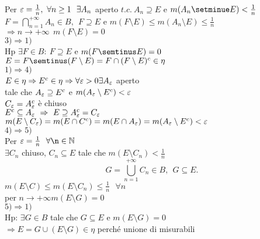\documentclass[12px]{article}
\begin{document}
\begin{dimo}
	  Per  $\e = \frac 1n, \ \forall n\geq 1 \ \ \exists A_n$ aperto $t.c. \ A_n\supseteq E$ e $m(A_n\setminue E)< \frac 1n$\\
	  $F = \bigcap^{+\infty}_{n=1}A_n\in B,\ \ F\supseteq E$ e $m(F\setminus E)\leq m(A_n\setminus E) \leq \frac 1n$\\
	  $ \Rightarrow  n \rightarrow +\infty \ \ m(F\setminus E) = 0$\\[10px]
	   $3) \Rightarrow 1)$ \\
	   Hp $\exists F\in B: \ F\supseteq E $ e $m(F\semtinus E) = 0$\\
	    $ E = F\semtinus(F\setminus E) = F\cap (F\setminus E)^c\in \eta$\\
	     $1) \Rightarrow 4)$ \\
	     $E\in \eta \Rightarrow E^c \in \eta \Rightarrow \forall \varepsilon > 0 \exists A_\varepsilon$ aperto\\
	     tale che $A_\varepsilon\supseteq E^c$ e $m(A_\varepsilon\setminus E^c)<\varepsilon$\\
	      $C_\varepsilon = A_\varepsilon^c$ è chiuso\\
	      $E^c\subseteq A_\varepsilon \ \Rightarrow \ E\supseteq A_\varepsilon^c = C_\varepsilon$ \\
	      $m(E\setminus C_\varepsilon) = m(E\cap C^c) = m(E\cap A_\varepsilon) = m(A_\varepsilon\setminus E^c)<\varepsilon$\\[10px]
	      $4) \Rightarrow  5)$ \\
	      Per $\e = \frac 1n \ \ \forall\n\in \N$\\
	       $\exists C_n$ chiuso, $C_n \subseteq E$ tale che  $m(E\setminus C_n)< \frac 1n$\\
	       \[
	         G = \bigcup^{+\infty}_{n = 1}C_n\in B,  \ \ G\subseteq E
	       .\]
	       $m(E\setminus C) \leq m(E\setminus C_n)\leq \frac 1n \ \ \ \forall n$\\
	       per $n \rightarrow +\infty m(E\setminus G) = 0$ \\[10px]
	       $5) \Rightarrow  1)$ \\
	       Hp: $\exists G \in B$ tale che $G\subseteq E$ e $m(E\setminus G) = 0$\\
	        $ \Rightarrow E = G\cup (E\setminus G)\in \eta$ perché unione di misurabili



\end{dimo}
	
\end{document}

